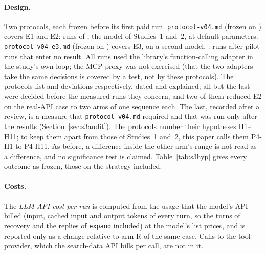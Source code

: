 \paragraph{Design.} Two protocols, each frozen before its first paid run. \texttt{protocol-v04.md} (frozen on
\SthreeFrozenVfour) covers E1 and E2: \SthreeRunsEOneTwo{} runs of \texttt{\SthreeModelA}, the model of Studies~1
and~2, at default parameters. \texttt{protocol-v04-e3.md} (frozen on \SthreeFrozenEthree) covers E3, on a second
model, \texttt{\SthreeModelB}: \SthreeRunsEThree{} runs after \SthreeRunsEThreePilot{} pilot runs that enter no
result. All runs used the library's function-calling adapter in the study's own loop; the MCP proxy was not
exercised (that the two adapters take the same decisions is covered by a test, not by these protocols). The
protocols list \SthreeDeviationsVfour{} and \SthreeDeviationsEthree{} deviations respectively, dated and explained;
all but the last were decided before the measured runs they concern, and two of them reduced E2 on the real-API case
to two arms of one sequence each. The last, recorded after a review, is a measure that \texttt{protocol-v04.md}
required and that was run only after the results (Section~\ref{sec:s3audit}). The protocols number their hypotheses H1--H11; to keep them apart
from those of Studies~1 and~2, this paper calls them P4-H1 to P4-H11. As before, a difference inside the other
arm's range is not read as a difference, and no significance test is claimed. Table~\ref{tab:s3hyp} gives every
outcome as frozen, those on the strategy included.

\paragraph{Costs.} The \emph{LLM API cost per run} is computed from the usage that the model's API billed (input,
cached input and output tokens of every turn, so the turns of recovery and the replies of \texttt{expand}
included) at the model's list prices, and is reported only as a change relative to arm R of the same case. Calls
to the tool provider, which the search-data API bills per call, are not in it.

\begin{table}[t]
\centering\small
\resizebox{\textwidth}{!}{}
\caption{Study 3: the hypotheses of \texttt{protocol-v04.md} (P4-H1 to P4-H7, on E1 and E2) and
\texttt{protocol-v04-e3.md} (P4-H8 to P4-H11, on E3), stated before the runs, with their outcomes as frozen. The
protocols call them H1--H11; the prefix keeps them apart from the hypotheses of Studies~1 and~2. A hypothesis whose
precondition did not occur is \emph{not testable}. ST and T: arms of E1 with the strategy and trimming, and with
trimming alone. The requirement of P4-H7 is the partial test described in Section~\ref{sec:s3e2}.}
\label{tab:s3hyp}
\end{table}


